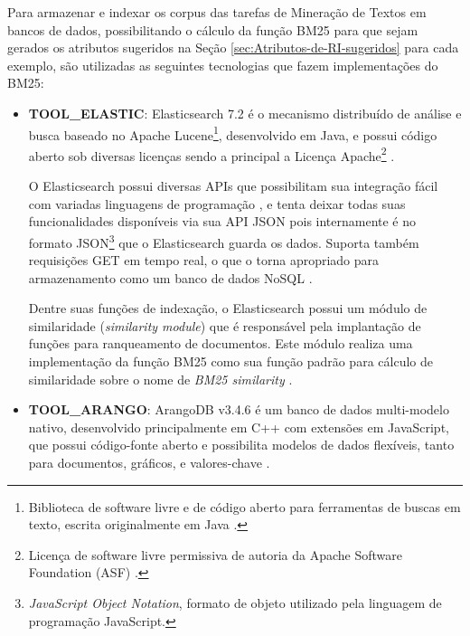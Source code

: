     Para armazenar e indexar os corpus das tarefas de Mineração de Textos em bancos de dados, possibilitando o cálculo da função BM25 para que sejam gerados os atributos sugeridos na Seção \ref{sec:Atributos-de-RI-sugeridos} para cada exemplo, são utilizadas as seguintes tecnologias que fazem implementações do BM25:
    \begin{itemize}
        \item \textbf{TOOL\_ELASTIC}: Elasticsearch 7.2 é o mecanismo distribuído de análise e busca baseado no Apache Lucene\footnote{Biblioteca de software livre e de código aberto para ferramentas de buscas em texto, escrita originalmente em Java \cite{LUCENE_DOCUMENTATION_2019}.}, desenvolvido em Java, e possui código aberto sob diversas licenças sendo a principal a Licença Apache\footnote{Licença de software livre permissiva de autoria da Apache Software Foundation (ASF) \cite{NEWMEDIA_OPENGUIDE_2015}.} \cite{ELASTIC_GitHub_2019, ELASTIC_REFERENCE_INTRO_2019}.  %
        
        O Elasticsearch possui diversas APIs que possibilitam sua integração fácil com variadas linguagens de programação \cite{ELASTIC_GitHub_2019}, e tenta deixar todas suas funcionalidades disponíveis via sua API JSON pois internamente é no formato JSON\footnote{\textit{JavaScript Object Notation}, formato de objeto utilizado pela linguagem de programação JavaScript.} que o Elasticsearch guarda os dados. 
        Suporta também requisições GET em tempo real, o que o torna apropriado para armazenamento como um banco de dados NoSQL \cite{PETER_ELASTICDB_2011, VOLKAN_ELASTIC_DATASTORE_2018}.
        
        Dentre suas funções de indexação, o Elasticsearch possui um módulo de similaridade (\textit{similarity module}) que é responsável pela implantação de funções para ranqueamento de documentos.
        Este módulo realiza uma implementação da função BM25 como sua função padrão para cálculo de similaridade sobre o nome de \textit{BM25 similarity} \cite{ELASTIC_REFERENCE_SIMILARITY_2019}.
        
        \item \textbf{TOOL\_ARANGO}: ArangoDB v3.4.6 é um banco de dados multi-modelo nativo, desenvolvido principalmente em C++ com extensões em JavaScript, que possui código-fonte aberto e possibilita modelos de dados flexíveis, tanto para documentos, gráficos, e valores-chave \cite{ARANGODB_DOC_2019, ARANGODB_GitHub_2019}.
        

\end{itemize}
